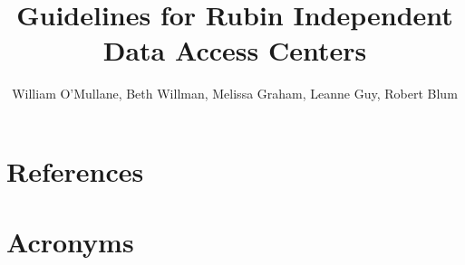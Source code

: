 \documentclass[DM,authoryear,toc]{lsstdoc}
\title[Independent DACs]{Guidelines for Rubin Independent Data Access Centers}
\author   {William O'Mullane, Beth Willman, Melissa Graham, Leanne Guy, Robert Blum }
\date{\vcsDate}
\begin{document}
\maketitle

\renewcommand{\thepage}{\arabic{page}}%

\setcounter{page}{1}%



%





\appendix
\section{References} \label{sec:bib}
\renewcommand{\refname}{} %


\section{Acronyms} \label{sec:acronyms}




\end{document}
